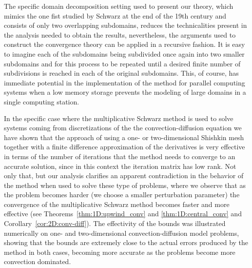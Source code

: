 The specific domain decomposition setting used to present our theory, which
mimics the one fist studied by Schwarz at the end of the 19th century and
consists of only two overlapping subdomains, reduces the technicalities present
in the analysis needed to obtain the results, nevertheless, the arguments used
to construct the convergence theory can be applied in a recursive fashion. It is
easy to imagine each of the subdomains being subdivided once again into two
smaller subdomains and for this process to be repeated until a desired
finite number of subdivisions is reached in each of the original subdomains.
This, of course, has immediate potential in the implementation of the method for
parallel computing systems when a low memory storage prevents the modeling of
large domains in a single computing station.

In the specific case where the multiplicative Schwarz method is used to solve
systems coming from discretizations of the the convection-diffusion equation we
have shown that the approach of using a one- or two-dimensional Shishkin mesh
together with a finite difference approximation of the derivatives is very
effective in terms of the number of iterations that the method needs to
converge to an accurate solution, since in this context the iteration matrix
has low rank. Not only that, but our analysis clarifies an apparent
contradiction in the behavior of the method when used to solve these type of
problems, where we observe that  as the problem becomes harder
(we choose a smaller perturbation parameter) the convergence of the
multiplicative Schwarz method becomes faster and more effective
(see Theorems~\ref{thm:1D:upwind_conv} and \ref{thm:1D:central_conv} and
Corollary~\ref{cor:2D:conv-diff}). The effectivity of the bounds was
illustrated numerically on one- and two-dimensional convection-diffusion model
problems, showing that the bounds are extremely close to the actual errors
produced by the method in both cases, becoming more accurate as the problems
become more convection dominated.

